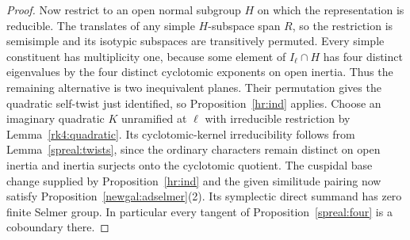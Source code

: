 \begin{proof}
Now restrict to an open normal subgroup
\(H\) on which the representation is reducible. The translates
of any simple \(H\)-subspace span \(R\), so the restriction is
semisimple and its isotypic subspaces are transitively permuted.
Every simple constituent has multiplicity one, because some
element of \(I_\ell\cap H\) has four distinct eigenvalues by the
four distinct cyclotomic exponents on open inertia. Thus the
remaining alternative is two inequivalent planes. Their permutation
gives the quadratic self-twist just identified, so
Proposition~\ref{hr:ind} applies. Choose an imaginary quadratic
\(K\) unramified at \(\ell\) with irreducible restriction by
Lemma~\ref{rk4:quadratic}. Its cyclotomic-kernel irreducibility
follows from Lemma~\ref{spreal:twists}, since the ordinary characters
remain distinct on open inertia and inertia surjects onto the
cyclotomic quotient. The cuspidal base change supplied by
Proposition~\ref{hr:ind} and the given similitude pairing now
satisfy Proposition~\ref{newgal:adselmer}(2). Its symplectic
direct summand has zero finite Selmer group. In particular every
tangent of Proposition~\ref{spreal:four} is a coboundary there.
\end{proof}

